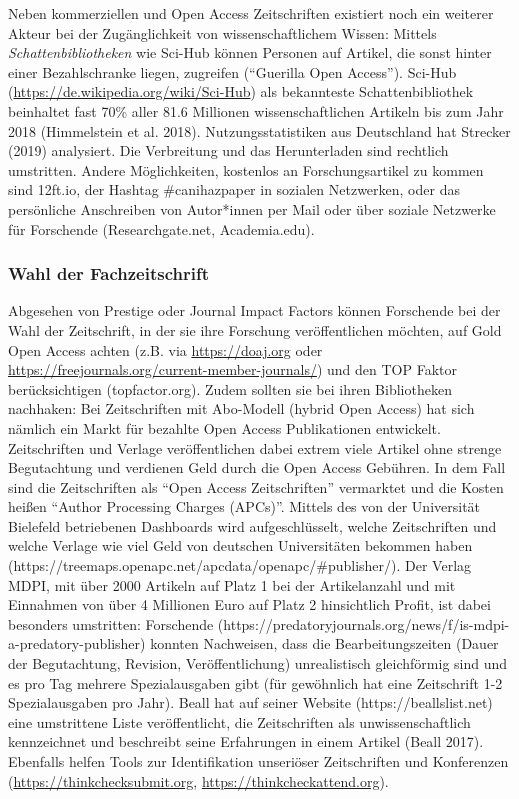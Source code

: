 \documentclass[
  letterpaper,
  DIV=11,
  numbers=noendperiod]{scrreprt}
\begin{document}
Neben kommerziellen und Open Access Zeitschriften existiert noch ein
weiterer Akteur bei der Zugänglichkeit von wissenschaftlichem Wissen:
Mittels \emph{Schattenbibliotheken} wie Sci-Hub können Personen auf
Artikel, die sonst hinter einer Bezahlschranke liegen, zugreifen
(``Guerilla Open Access''). Sci-Hub
(\url{https://de.wikipedia.org/wiki/Sci-Hub}) als bekannteste
Schattenbibliothek beinhaltet fast 70\% aller 81.6 Millionen
wissenschaftlichen Artikeln bis zum Jahr 2018 (Himmelstein et al. 2018).
Nutzungsstatistiken aus Deutschland hat Strecker (2019) analysiert. Die
Verbreitung und das Herunterladen sind rechtlich umstritten. Andere
Möglichkeiten, kostenlos an Forschungsartikel zu kommen sind 12ft.io,
der Hashtag \#canihazpaper in sozialen Netzwerken, oder das persönliche
Anschreiben von Autor*innen per Mail oder über soziale Netzwerke für
Forschende (Researchgate.net, Academia.edu).

\subsubsection{Wahl der Fachzeitschrift}\label{wahl-der-fachzeitschrift}

Abgesehen von Prestige oder Journal Impact Factors können Forschende bei
der Wahl der Zeitschrift, in der sie ihre Forschung veröffentlichen
möchten, auf Gold Open Access achten (z.B. via \url{https://doaj.org}
oder \url{https://freejournals.org/current-member-journals/}) und den
TOP Faktor berücksichtigen (topfactor.org). Zudem sollten sie bei ihren
Bibliotheken nachhaken: Bei Zeitschriften mit Abo-Modell (hybrid Open
Access) hat sich nämlich ein Markt für bezahlte Open Access
Publikationen entwickelt. Zeitschriften und Verlage veröffentlichen
dabei extrem viele Artikel ohne strenge Begutachtung und verdienen Geld
durch die Open Access Gebühren. In dem Fall sind die Zeitschriften als
``Open Access Zeitschriften'' vermarktet und die Kosten heißen ``Author
Processing Charges (APCs)''. Mittels des von der Universität Bielefeld
betriebenen Dashboards wird aufgeschlüsselt, welche Zeitschriften und
welche Verlage wie viel Geld von deutschen Universitäten bekommen haben
(https://treemaps.openapc.net/apcdata/openapc/\#publisher/). Der Verlag
MDPI, mit über 2000 Artikeln auf Platz 1 bei der Artikelanzahl und mit
Einnahmen von über 4 Millionen Euro auf Platz 2 hinsichtlich Profit, ist
dabei besonders umstritten: Forschende
(https://predatoryjournals.org/news/f/is-mdpi-a-predatory-publisher)
konnten Nachweisen, dass die Bearbeitungszeiten (Dauer der Begutachtung,
Revision, Veröffentlichung) unrealistisch gleichförmig sind und es pro
Tag mehrere Spezialausgaben gibt (für gewöhnlich hat eine Zeitschrift
1-2 Spezialausgaben pro Jahr). Beall hat auf seiner Website
(https://beallslist.net) eine umstrittene Liste veröffentlicht, die
Zeitschriften als unwissenschaftlich kennzeichnet und beschreibt seine
Erfahrungen in einem Artikel (Beall 2017). Ebenfalls helfen Tools zur
Identifikation unseriöser Zeitschriften und Konferenzen
(\hyperref[0]{https://thinkchecksubmit.org},
\hyperref[0]{https://thinkcheckattend.org}).
\end{document}
